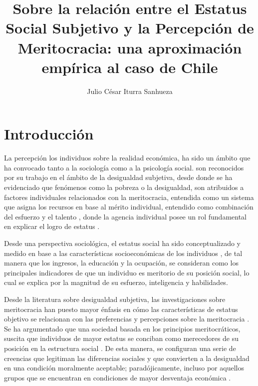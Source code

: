 \documentclass[12pt]{article}
\title{Sobre la relación entre el Estatus Social Subjetivo y la Percepción de Meritocracia: una aproximación empírica al caso de Chile}
\author{Julio César Iturra Sanhueza}
\begin{document}
\maketitle

 
%
%
%
%
% 


\setcounter{page}{1}
\tableofcontents
\newpage
\listoffigures
\listoftables
\newpage		

\section{Introducción}

La percepción los individuos sobre la realidad económica, ha sido un ámbito que ha convocado tanto a la sociología como a la psicología social.  \citet{Smith1981} son reconocidos por su trabajo en el ámbito de la desigualdad subjetiva, desde donde se ha evidenciado que fenómenos como la pobreza o la desigualdad, son atribuidos a factores individuales relacionados con la  meritocracia, entendida como un sistema que asigna los recursos en base al mérito individual, entendido como combinación del esfuerzo y el talento \citep{Young1961}, donde la agencia individual posee un rol fundamental en explicar el logro de estatus \citep{Osborne2015,Schneider2015}. 
 
Desde una perspectiva sociológica, el estatus social ha sido conceptualizado y medido en base a las características socioeconómicas de los individuos \cite{Ganzeboom1991,Ganzeboom1992}, de tal manera que los ingresos, la educación y la ocupación, se consideran como los principales indicadores de que un individuo es meritorio de su posición social, lo cual se explica por la magnitud de su esfuerzo, inteligencia y habilidades. 

Desde la literatura sobre desigualdad subjetiva, las investigaciones sobre meritocracia han puesto mayor énfasis en cómo las características de estatus objetivo se relacionan con las preferencias y percepciones sobre la meritocracia \citep{Kunovich2007,Reynolds2014,Solt2016,Xian2017}. Se ha argumentado que una sociedad basada en los principios meritocráticos, suscita que individuos de mayor estatus se conciban como merecedores de su posición en la estructura social \citep{McCoy2007}. De esta manera, se configuran una serie de creencias que legitiman las diferencias sociales y que convierten a la desigualdad en una condición moralmente aceptable; paradójicamente, incluso por aquellos grupos que se encuentran en condiciones de mayor desventaja económica \citep{Trump2017}. 
\end{document}
